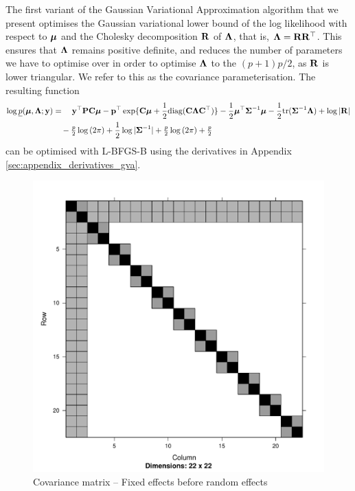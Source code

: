 	The first variant of the Gaussian Variational Approximation algorithm that we present optimises the
	Gaussian variational lower bound of the log likelihood with respect to ${\boldsymbol \mu}$ and the Cholesky decomposition
	${\bf R}$ of ${\boldsymbol \Lambda}$, that is, ${\boldsymbol \Lambda} = {\bf R} {\bf R}^\top$. This ensures that ${\boldsymbol \Lambda}$ remains positive
	definite, and reduces the number of parameters we have to optimise over in order to optimise ${\boldsymbol \Lambda}$
	to the $(p + 1) p / 2$, as ${\bf R}$ is lower triangular.	We refer to this as the covariance
	parameterisation. The resulting function
	\begin{align*}
		\log \underline{p}({\boldsymbol \mu}, {\boldsymbol \Lambda}; {\bf y}) & = \quad {\bf y}^\top{\bf P} {\bf C} {\boldsymbol\mu} - {\bf p}^\top \exp\{{\bf C} {\boldsymbol \mu} + \frac{1}{2} \text{diag}({\bf C} {\boldsymbol \Lambda} {\bf C}^\top)\} - \frac{1}{2} {\boldsymbol \mu}^\top {\boldsymbol\Sigma}^{-1} {\boldsymbol \mu} - \frac{1}{2} \text{tr}{({\boldsymbol\Sigma}^{-1} {\boldsymbol\Lambda})} + \log{|{\bf R}|} \\
		                                        & \quad - \tfrac{p}{2} \log{(2 \pi)} + \frac{1}{2} \log{|{\boldsymbol\Sigma}^{-1}|} + \tfrac{p}{2} \log{(2 \pi)} + \tfrac{p}{2}                                                                              
	\end{align*}
	can be optimised with L-BFGS-B using the derivatives in Appendix \ref{sec:appendix_derivatives_gva}.
	
	\begin{figure}[p]
		\includegraphics[width=0.95 \textwidth]{mX_mZ_mLambda.pdf}
		\caption{\tiny Covariance matrix -- Fixed effects before random effects}
		\label{fig:covfixedrandom}
	\end{figure}
		
